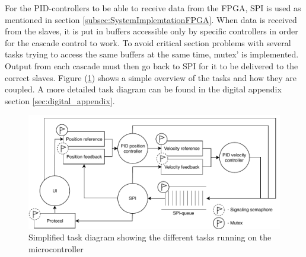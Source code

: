 \documentclass[../../main.tex]{subfiles}
\begin{document}
For the PID-controllers to be able to receive data from the FPGA, SPI is used as mentioned in section \ref{subsec:SystemImplemtationFPGA}. When data is received from the slaves, it is put in buffers accessible only by specific controllers in order for the cascade control to work. To avoid critical section problems with several tasks trying to access the same buffers at the same time, mutex' is implemented. Output from each cascade must then go back to SPI for it to be delivered to the correct slaves. Figure (\ref{fig:OverviewTaskDiagramSimple}) shows a simple overview of the tasks and how they are coupled. A more detailed task diagram can be found in the digital appendix section \ref{sec:digital_appendix}.

\begin{figure}[H]
    \centering
    \includegraphics[width=\textwidth]{Sections/System_Implementation/Images/OverviewTaskDiagramSimple.pdf}
    \caption{Simplified task diagram showing the different tasks running on the microcontroller}
    \label{fig:OverviewTaskDiagramSimple}
\end{figure}
\end{document}

